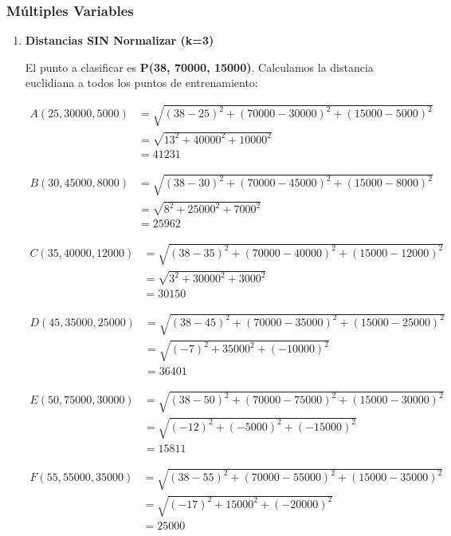 \documentclass[12pt]{article}
\begin{document}
\subsubsection{Múltiples Variables}

\begin{enumerate}
    \item \textbf{Distancias SIN Normalizar (k=3)}
    
    El punto a clasificar es \textbf{P(38, 70000, 15000)}. Calculamos la distancia euclidiana a todos los puntos de entrenamiento:
    
    \begin{align*}
        A(25, 30000, 5000) & = \sqrt{(38-25)^2 + (70000-30000)^2 + (15000-5000)^2} \\ &= \sqrt{13^2 + 40000^2 + 10000^2} \\ &= 41231
    \end{align*}

    \begin{align*}
        B(30, 45000, 8000) & = \sqrt{(38-30)^2 + (70000-45000)^2 + (15000-8000)^2} \\ &= \sqrt{8^2 + 25000^2 + 7000^2} \\ &= 25962
    \end{align*}

    \begin{align*}
        C(35, 40000, 12000) & = \sqrt{(38-35)^2 + (70000-40000)^2 + (15000-12000)^2} \\ &= \sqrt{3^2 + 30000^2 + 3000^2} \\ &= 30150
    \end{align*}

    \begin{align*}
        D(45, 35000, 25000) & = \sqrt{(38-45)^2 + (70000-35000)^2 + (15000-25000)^2} \\ &= \sqrt{(-7)^2 + 35000^2 + (-10000)^2} \\ &= 36401
    \end{align*}

    \begin{align*}
        E(50, 75000, 30000) & = \sqrt{(38-50)^2 + (70000-75000)^2 + (15000-30000)^2} \\ &= \sqrt{(-12)^2 + (-5000)^2 + (-15000)^2} \\ &= 15811
    \end{align*}

    \begin{align*}
        F(55, 55000, 35000) & = \sqrt{(38-55)^2 + (70000-55000)^2 + (15000-35000)^2} \\ &= \sqrt{(-17)^2 + 15000^2 + (-20000)^2} \\ &= 25000
    \end{align*}


\end{enumerate}
\end{document}
